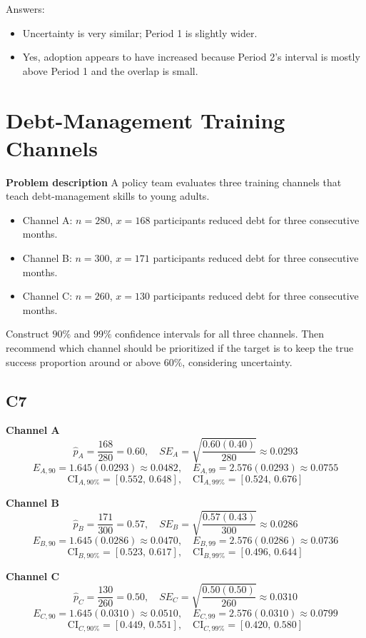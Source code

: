 	Answers:
	\begin{itemize}
		\item Uncertainty is very similar; Period 1 is slightly wider.
		\item Yes, adoption appears to have increased because Period 2's interval is mostly above Period 1 and the overlap is small.
	\end{itemize}
	
	\section{Debt-Management Training Channels}
	\textbf{Problem description}
	A policy team evaluates three training channels that teach debt-management skills to young adults.
	\begin{itemize}
		\item Channel A: \(n=280\), \(x=168\) participants reduced debt for three consecutive months.
		\item Channel B: \(n=300\), \(x=171\) participants reduced debt for three consecutive months.
		\item Channel C: \(n=260\), \(x=130\) participants reduced debt for three consecutive months.
	\end{itemize}
	Construct \(90\%\) and \(99\%\) confidence intervals for all three channels. Then recommend which channel should be prioritized if the target is to keep the true success proportion around or above \(60\%\), considering uncertainty.
	
	\subsection*{C7}
	\textbf{Channel A}
	\[
	\hat p_A=\frac{168}{280}=0.60,
	\quad SE_A=\sqrt{\frac{0.60(0.40)}{280}}\approx 0.0293
	\]
	\[
	E_{A,90}=1.645(0.0293)\approx 0.0482,
	\quad E_{A,99}=2.576(0.0293)\approx 0.0755
	\]
	\[
	\text{CI}_{A,90\%}=[0.552,\,0.648],
	\quad \text{CI}_{A,99\%}=[0.524,\,0.676]
	\]
	
	\textbf{Channel B}
	\[
	\hat p_B=\frac{171}{300}=0.57,
	\quad SE_B=\sqrt{\frac{0.57(0.43)}{300}}\approx 0.0286
	\]
	\[
	E_{B,90}=1.645(0.0286)\approx 0.0470,
	\quad E_{B,99}=2.576(0.0286)\approx 0.0736
	\]
	\[
	\text{CI}_{B,90\%}=[0.523,\,0.617],
	\quad \text{CI}_{B,99\%}=[0.496,\,0.644]
	\]
	
	\textbf{Channel C}
	\[
	\hat p_C=\frac{130}{260}=0.50,
	\quad SE_C=\sqrt{\frac{0.50(0.50)}{260}}\approx 0.0310
	\]
	\[
	E_{C,90}=1.645(0.0310)\approx 0.0510,
	\quad E_{C,99}=2.576(0.0310)\approx 0.0799
	\]
	\[
	\text{CI}_{C,90\%}=[0.449,\,0.551],
	\quad \text{CI}_{C,99\%}=[0.420,\,0.580]
	\]
	

